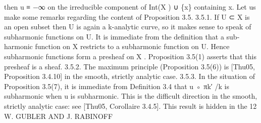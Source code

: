 \documentclass[
  10pt,
]{article}
\newenvironment{Shaded}{}{}
\newcommand{\NormalTok}[1]{#1}
\begin{document}
\begin{Shaded}
\begin{Highlighting}[]
\NormalTok{       then u ≡ −∞ on the irreducible component of Int(X ) ∪ \{x\} containing x.}
\NormalTok{  Let us make some remarks regarding the content of Proposition 3.5.}
\NormalTok{3.5.1. If U ⊂ X is an open subset then U is again a k{-}analytic curve, so it makes sense}
\NormalTok{to speak of subharmonic functions on U. It is immediate from the definition that a sub{-}}
\NormalTok{harmonic function on X restricts to a subharmonic function on U. Hence subharmonic}
\NormalTok{functions form a presheaf on X . Proposition 3.5(1) asserts that this presheaf is a sheaf.}
\NormalTok{3.5.2. The maximum principle (Proposition 3.5(6)) is [Thu05, Proposition 3.4.10] in the}
\NormalTok{smooth, strictly analytic case.}
\NormalTok{3.5.3. In the situation of Proposition 3.5(7), it is immediate from Definition 3.4 that}
\NormalTok{u ◦ πk′ /k is subharmonic when u is subharmonic. This is the difficult direction in the}
\NormalTok{smooth, strictly analytic case: see [Thu05, Corollaire 3.4.5]. This result is hidden in the}
\NormalTok{12                                 W. GUBLER AND J. RABINOFF}


\end{Highlighting}
\end{Shaded}
\end{document}
